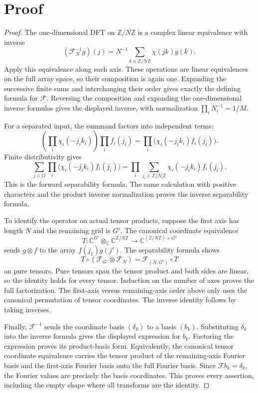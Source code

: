 \documentclass[11pt]{article}
\newcommand{\C}{\mathbb C}
\newcommand{\Z}{\mathbb Z}
\newcommand{\F}{\mathcal F}
\begin{document}
\section{Proof}
\begin{proof}
The one-dimensional DFT on $\Z/N\Z$ is a complex linear equivalence
with inverse
\[
(\F_N^{-1}g)(j)=N^{-1}\sum_{k\in\Z/N\Z}\chi(jk)g(k).
\]
Apply this equivalence along each axis. These operations are linear
equivalences on the full array space, so their composition is again
one. Expanding the successive finite sums and interchanging their order
gives exactly the defining formula for $\F$. Reversing the composition
and expanding the one-dimensional inverse formulas gives the displayed
inverse, with normalization $\prod_iN_i^{-1}=1/M$.

For a separated input, the summand factors into independent terms:
\[
\left(\prod_i\chi_i(-j_i k_i)\right)\prod_i f_i(j_i)
=\prod_i\bigl(\chi_i(-j_i k_i)f_i(j_i)\bigr).
\]
Finite distributivity gives
\[
\sum_{j\in G}\prod_i\bigl(\chi_i(-j_i k_i)f_i(j_i)\bigr)
=\prod_i\sum_{j_i\in\Z/N_i\Z}\chi_i(-j_i k_i)f_i(j_i).
\]
This is the forward separability formula. The same calculation with
positive characters and the product inverse normalization proves the
inverse separability formula.

To identify the operator on actual tensor products, suppose the first
axis has length $N$ and the remaining grid is $G'$. The canonical
coordinate equivalence
\[
T:\C^{G'}\otimes_{\C}\C^{\Z/N\Z}
\longrightarrow \C^{(\Z/N\Z)\times G'}
\]
sends $g\otimes f$ to the array $f(j_1)g(j')$. The separability formula
shows
\[
T\circ(\F_{G'}\otimes\F_N)=\F_{(N,G')}\circ T
\]
on pure tensors. Pure tensors span the tensor product and both sides
are linear, so the identity holds for every tensor. Induction on the
number of axes proves the full factorization. The first-axis versus
remaining-axis order above only uses the canonical permutation of
tensor coordinates. The inverse identity follows by taking inverses.

Finally, $\F^{-1}$ sends the coordinate basis $(\delta_k)$ to a basis
$(b_k)$. Substituting $\delta_k$ into the inverse formula gives the
displayed expression for $b_k$. Factoring the expression proves its
product-basis form. Equivalently, the canonical tensor coordinate
equivalence carries the tensor product of the remaining-axis Fourier
basis and the first-axis Fourier basis onto the full Fourier basis.
Since $\F b_k=\delta_k$, the Fourier values are precisely the basis
coordinates. This proves every assertion, including the empty shape
where all transforms are the identity.
\end{proof}
\end{document}
